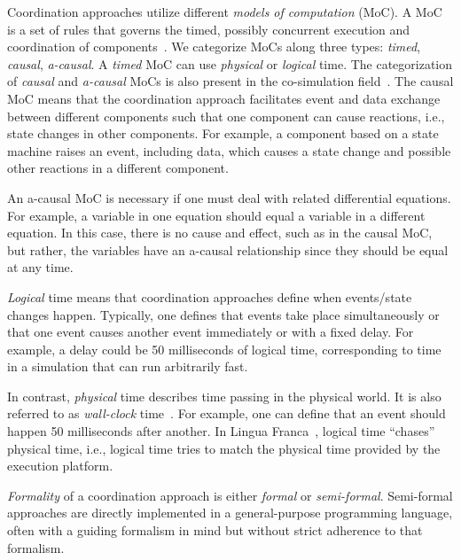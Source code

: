 \documentclass[runningheads]{llncs}
\newcommand{\quotes}[1]{``#1''}
\begin{document}
Coordination approaches utilize different \textit{models of computation} (MoC).
A MoC is a set of rules that governs the timed, possibly concurrent execution and coordination of components~\cite{ptolemaeusSystemDesignModeling2014}.
We categorize MoCs along three types: \textit{timed}, \textit{causal}, \textit{a-causal}.
A \textit{timed} MoC can use \textit{physical} or \textit{logical} time.
The categorization of \textit{causal} and \textit{a-causal} MoCs is also present in the co-simulation field~\cite{gomesCoSimulationSurvey2019}.
The causal MoC means that the coordination approach facilitates event and data exchange between different components such that one component can cause reactions, i.e., state changes in other components.
For example, a component based on a state machine raises an event, including data, which causes a state change and possible other reactions in a different component.

An a-causal MoC is necessary if one must deal with related differential equations.
For example, a variable in one equation should equal a variable in a different equation.
In this case, there is no cause and effect, such as in the causal MoC, but rather, the variables have an a-causal relationship since they should be equal at any time.

\textit{Logical} time means that coordination approaches define when events/state changes happen.
Typically, one defines that events take place simultaneously or that one event causes another event immediately or with a fixed delay.
For example, a delay could be 50 milliseconds of logical time, corresponding to time in a simulation that can run arbitrarily fast.

In contrast, \textit{physical} time describes time passing in the physical world.
It is also referred to as \textit{wall-clock} time~\cite{gomesCoSimulationSurvey2019}.
For example, one can define that an event should happen 50 milliseconds after another.
In Lingua Franca~\cite{lohstrohReactorsDeterministicModel2020}, logical time \quotes{chases} physical time, i.e., logical time tries to match the physical time provided by the execution platform.

\textit{Formality} of a coordination approach is either \textit{formal} or \textit{semi-formal}.
Semi-formal approaches are directly implemented in a general-purpose programming language, often with a guiding formalism in mind but without strict adherence to that formalism.
\end{document}
